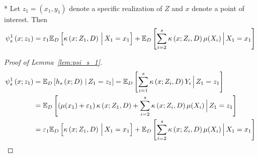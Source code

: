 \begin{boxD}
    \begin{lem}\label{lem:psi_s_1}\mbox{}\\*
	Let $z_1 = (x_1, y_1)$ denote a specific realization of $Z$ and $x$ denote a point of interest.
	Then
	\begin{equation}
		\psi_{s}^{1}\left(x; z_1\right)
		= \varepsilon_1 \mathbb{E}_D\left[\kappa\left(x; Z_1, D\right)\, \Big| \, X_1 = x_1 \right]
		+ \mathbb{E}_{D}\left[\sum_{i = 2}^{s} \kappa\left(x; Z_{i}, D\right) \mu(X_{i})\, \Big| \, X_1 = x_1 \right]
	\end{equation}
\end{lem}
\end{boxD}

\begin{proof}[Proof of Lemma~\ref{lem:psi_s_1}]
	\begin{equation}
		\begin{aligned}
			\psi_{s}^{1}\left(x; z_1\right)
			 & = \mathbb{E}_{D}\left[h_{s}\left(x; D\right) \, | \, Z_1 = z_1 \right]
			= \mathbb{E}_{D}\left[\sum_{i = 1}^{s} \kappa\left(x; Z_{i}, D\right) Y_{i} \, \Big| \, Z_1 = z_1 \right] \\
			 & = \mathbb{E}_{D}\left[\left(\mu(x_1) + \varepsilon_1\right)\kappa\left(x; Z_1, D\right)
			+ \sum_{i = 2}^{s} \kappa\left(x; Z_{i}, D\right) \mu(X_{i})\, \Big| \, Z_1 = z_1 \right]         \\
			 & = \varepsilon_1 \mathbb{E}_D\left[\kappa\left(x; Z_1, D\right)\, \Big| \, X_1 = x_1 \right]
			+ \mathbb{E}_{D}\left[\sum_{i = 2}^{s} \kappa\left(x; Z_{i}, D\right) \mu(X_{i})\, \Big| \, X_1 = x_1 \right]
		\end{aligned}
	\end{equation}
\end{proof}
